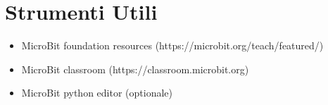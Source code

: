 \documentclass[../../docenti.tex]{subfiles}
\begin{document}
\section{Strumenti Utili}

\begin{itemize}
	\item MicroBit foundation resources (https://microbit.org/teach/featured/)
	\item MicroBit classroom (https://classroom.microbit.org)
	\item MicroBit python editor (optionale)
\end{itemize}
\end{document}
